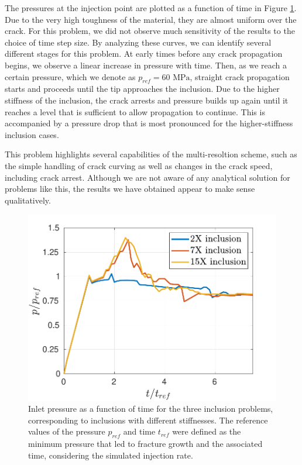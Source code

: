 The pressures at the injection point are plotted as a function of time in Figure \ref{fig:inclusion_pressures}. Due to the very high toughness of the material, they are almost uniform over the crack.  For this problem, we did not observe much sensitivity of the results to the choice of time step size.  By analyzing these curves, we can identify several different stages for this problem.  At early times before any crack propagation begins, we observe a linear increase in pressure with time. Then, as we reach a certain pressure, which we denote as $p_{ref} = 60 \text{ MPa}$, straight crack propagation starts and proceeds until the tip approaches the inclusion. Due to the higher stiffness of the inclusion, the crack arrests and pressure builds up again until it reaches a level that is sufficient to allow propagation to continue.  This is accompanied by a pressure drop that is most pronounced for the higher-stiffness inclusion cases.  

This problem highlights several capabilities of the multi-resoltion scheme, such as the simple handling of crack curving as well as changes in the crack speed, including crack arrest. 
Although we are not aware of any analytical solution for problems like this, the results we have obtained appear to make sense qualitatively. 
\begin{figure}
\centering
\includegraphics[width=0.5\linewidth]{img/inclusion_prob/inclusion_pressures}
  \caption{Inlet pressure as a function of time for the three inclusion problems, corresponding to inclusions with different stiffnesses. The reference values of the pressure $p_{ref}$ and time $t_{ref}$ were defined as the minimum pressure that led to fracture growth and the associated time, considering the simulated injection rate.} 
  \label{fig:inclusion_pressures}
\end{figure}
\FloatBarrier

